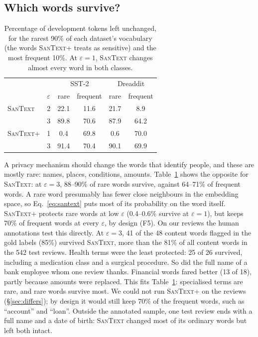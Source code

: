 \documentclass[11pt]{article}
\newcommand{\santext}{\textsc{SanText}}
\newcommand{\santextp}{\textsc{SanText}+}
\begin{document}
\subsection{Which words survive?}
\label{sec:survival}
\begin{table}[t]
\centering\small
\setlength{\tabcolsep}{4pt}
\begin{tabular}{@{}llcccc@{}}
\toprule
 & & \multicolumn{2}{c}{SST-2} & \multicolumn{2}{c}{Dreaddit} \\
 & $\varepsilon$ & rare & frequent & rare & frequent \\
\midrule
\santext & 2 & 22.1 & 11.6 & 21.7 & 8.9 \\
 & 3 & 89.8 & 70.6 & 87.9 & 64.2 \\
\santextp & 1 & 0.4 & 69.8 & 0.6 & 70.0 \\
 & 3 & 91.4 & 70.4 & 90.1 & 69.9 \\
\bottomrule
\end{tabular}
\caption{Percentage of development tokens left unchanged, for the rarest 90\% of each dataset's vocabulary (the words \santextp{} treats as sensitive) and the most frequent 10\%. At $\varepsilon = 1$, \santext{} changes almost every word in both classes.}
\label{tab:classes}
\end{table}
A privacy mechanism should change the words that identify people, and these are mostly rare: names, places, conditions, amounts. Table~\ref{tab:classes} shows the opposite for \santext{}: at $\varepsilon = 3$, 88--90\% of rare words survive, against 64--71\% of frequent words. A rare word presumably has fewer close neighbours in the embedding space, so Eq.~\ref{eq:santext} puts most of its probability on the word itself. \santextp{} protects rare words at low $\varepsilon$ (0.4--0.6\% survive at $\varepsilon = 1$), but keeps 70\% of frequent words at every $\varepsilon$, by design (F5). On our reviews the human annotations test this directly. At $\varepsilon = 3$, 41 of the 48 content words flagged in the gold labels (85\%) survived \santext{}, more than the 81\% of all content words in the 542 test reviews. Health terms were the least protected: 25 of 26 survived, including a medication class and a surgical procedure. So did the full name of a bank employee whom one review thanks. Financial words fared better (13 of 18), partly because amounts were replaced. This fits Table~\ref{tab:classes}: specialised terms are rare, and rare words survive most. We could not run \santextp{} on the reviews (§\ref{sec:differs}); by design it would still keep 70\% of the frequent words, such as ``account'' and ``loan''. Outside the annotated sample, one test review ends with a full name and a date of birth: \santext{} changed most of its ordinary words but left both intact.
\end{document}
